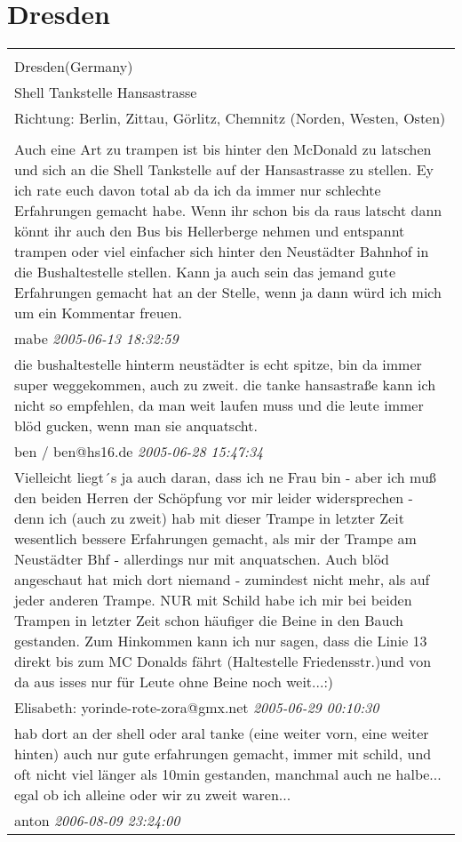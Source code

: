 \documentclass[a4paper,12pt]{article}
\begin{document}
\section{Dresden}
\begin{tabular}{|p{13cm}|}
\hline\\
Dresden(Germany)\\
Shell Tankstelle Hansastrasse\\
Richtung: Berlin, Zittau, Görlitz, Chemnitz (Norden, Westen, Osten) \\
\hline\\
Auch eine Art zu trampen ist bis hinter den McDonald zu latschen und sich an die Shell Tankstelle auf der Hansastrasse zu stellen. Ey ich rate euch davon total ab da ich da immer nur schlechte Erfahrungen gemacht habe. Wenn ihr schon bis da raus latscht dann könnt ihr auch den Bus bis Hellerberge nehmen und entspannt trampen oder viel einfacher sich hinter den Neustädter Bahnhof in die Bushaltestelle stellen. Kann ja auch sein das jemand gute Erfahrungen gemacht hat an der Stelle, wenn ja dann würd ich mich um ein Kommentar freuen. \\
mabe \textit{ 2005-06-13 18:32:59 }\\\hline die bushaltestelle hinterm neustädter is echt spitze, bin da immer super weggekommen, auch zu zweit. die tanke hansastraße kann ich nicht so empfehlen, da man weit laufen muss und die leute immer blöd gucken, wenn man sie anquatscht. \\
ben / ben@hs16.de \textit{ 2005-06-28 15:47:34 }\\\hline Vielleicht liegt´s ja auch daran, dass ich ne Frau bin - aber ich muß den beiden Herren der Schöpfung vor mir leider widersprechen - denn ich (auch zu zweit) hab mit dieser Trampe in letzter Zeit wesentlich bessere Erfahrungen gemacht, als mir der Trampe am Neustädter Bhf - allerdings nur mit anquatschen. Auch blöd angeschaut hat mich dort niemand - zumindest nicht mehr, als auf jeder anderen Trampe.
NUR mit Schild habe ich mir bei beiden Trampen in letzter Zeit schon häufiger die Beine in den Bauch gestanden.
Zum Hinkommen kann ich nur sagen, dass die Linie 13 direkt bis zum MC Donalds fährt (Haltestelle Friedensstr.)und von da aus isses nur für Leute ohne Beine noch weit...:) \\
Elisabeth: yorinde-rote-zora@gmx.net \textit{ 2005-06-29 00:10:30 }\\\hline hab dort an der shell oder aral tanke (eine weiter vorn, eine weiter hinten) auch nur gute erfahrungen gemacht, immer mit schild, und oft nicht viel länger als 10min gestanden, manchmal auch ne halbe... egal ob ich alleine oder wir zu zweit waren... \\
anton \textit{ 2006-08-09 23:24:00 }\\\hline
\end{tabular}
\end{document}
